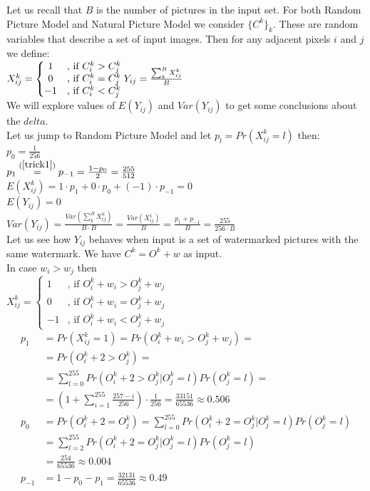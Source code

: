 \documentclass[a4paper,12pt]{article}
\begin{document}
Let us recall that $B$ is the number of pictures in the input set.
For both Random Picture Model and Natural Picture Model we consider $\{C^k\}_k$.
These are random variables that describe a set of input images. Then
for any adjacent pixels $i$ and $j$ we
define:\\
$X^k_{ij} =
\left\{
\begin{matrix}
1 & \text{, if } C^k_i > C^k_j\\
0 & \text{, if } C^k_i = C^k_j\\
-1 & \text{, if } C^k_i < C^k_j
\end{matrix}\right.\\
Y_{ij} = \frac{\sum^B_k X^k_{ij}}{B}$\\
We will explore values of $E(Y_{ij})$ and $Var(Y_{ij})$ to get some conclusions
about the $delta$.\\
Let us jump to Random Picture Model and let $p_l = Pr(X^k_{ij} = l)$ then:\\
$p_0 = \frac{1}{256}$\\
$p_1 \stackrel{(\ref{trick1})}{=} p_{-1} = \frac{1-p_0}{2} = \frac{255}{512}$\\
$E(X^k_{ij}) = 1\cdot p_1 + 0\cdot p_0 + (-1)\cdot p_{-1} = 0$\\
$E(Y_{ij}) = 0$\\
$Var(Y_{ij}) = \frac{Var(\sum^B_k X^k_{ij})}{B\cdot B} = \frac{Var(X^1_{ij})}{B} = \frac{p_1 + p_{-1}}{B} = \frac{255}{256\cdot B}$\\
Let us see how $Y_{ij}$ behaves when input is a set of watermarked pictures with
the same watermark. We have $C^k = O^k + w$ as input.\\
In case $w_i > w_j$ then\\
$X^k_{ij} =
\left\{
\begin{matrix}
1 & \text{, if } O^k_i + w_i > O^k_j + w_j\\
0 & \text{, if } O^k_i + w_i = O^k_j + w_j\\
-1 & \text{, if } O^k_i + w_i < O^k_j + w_j
\end{matrix}\right.$\\
\begin{align*}
p_1 &= Pr(X^k_{ij} = 1) = Pr(O^k_i + w_i > O^k_j + w_j) =\\
    &= Pr(O^k_i + 2 > O^k_j) =\\
    &= \sum_{l=0}^{255} Pr(O^k_i + 2 > O^k_j | O^k_j = l)Pr(O^k_j = l) =\\
    &= \left(1 + \sum_{i=1}^{255} \frac{257-i}{256}\right)\cdot \frac{1}{256} = \frac{33151}{65536}\approx 0.506\\
p_0 &= Pr(O^k_i + 2 = O^k_j) = \sum_{l=0}^{255} Pr(O^k_i + 2 = O^k_j | O^k_j = l)Pr(O^k_j = l)\\
    &= \sum_{l=2}^{255} Pr(O^k_i + 2 = O^k_j | O^k_j = l)Pr(O^k_j = l)\\
    &= \frac{254}{65536} \approx 0.004\\
p_{-1} &= 1 - p_0 - p_1 = \frac{32131}{65536} \approx 0.49
\end{align*}\\
\end{document}
